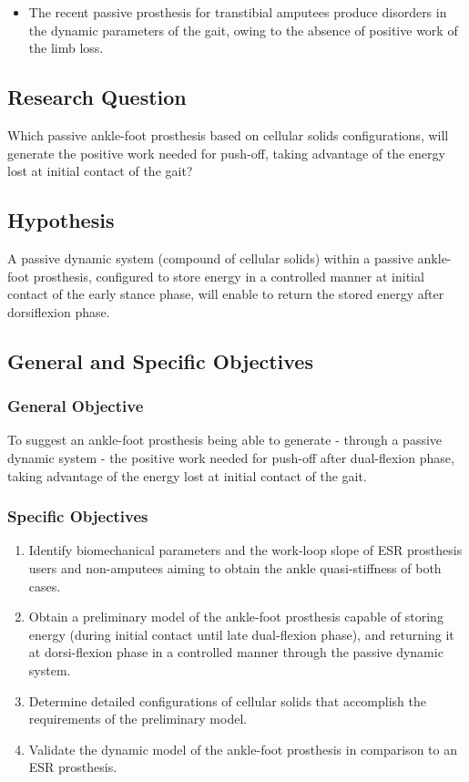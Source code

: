 \documentclass[12pt,english]{article}
\begin{document}
\begin{itemize}
\item The recent passive prosthesis for transtibial amputees produce disorders in the dynamic parameters of the gait, owing to the absence of positive work of the limb loss. 
\end{itemize}

\subsection{Research Question}

Which passive ankle-foot prosthesis based on cellular solids configurations, will generate the positive work needed for push-off, taking advantage of the energy lost at initial contact of the gait?

\subsection{Hypothesis}

A passive dynamic system (compound of cellular solids) within a passive ankle-foot prosthesis, configured to store energy in a controlled manner at initial contact of the early stance phase, will enable to return the stored energy after dorsiflexion phase.



\subsection{General and Specific Objectives}

\subsubsection{General Objective} To suggest an ankle-foot prosthesis being able to generate - through a passive dynamic system - the positive work needed for push-off after dual-flexion phase, taking advantage of the energy lost at initial contact of the gait.

\subsubsection{Specific Objectives}
\begin{enumerate}
\item Identify biomechanical parameters and the work-loop slope of ESR prosthesis users and non-amputees aiming to obtain the ankle quasi-stiffness of both cases.

\item Obtain a preliminary model of the ankle-foot prosthesis capable of storing energy (during initial contact until late dual-flexion phase), and returning it at dorsi-flexion phase in a controlled manner through the passive dynamic system.

\item Determine detailed configurations of cellular solids that accomplish the requirements of the preliminary model.
\item Validate the dynamic model of the ankle-foot prosthesis in comparison to an ESR prosthesis. \end{enumerate}
\end{document}
